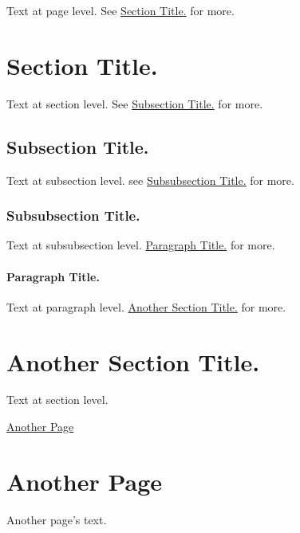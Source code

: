Text at page level. See \hyperlink{mypage_mysect}{Section Title.} for more. \hypertarget{mypage_mysect}{}\section{Section Title.}\label{mypage_mysect}
Text at section level. See \hyperlink{mypage_mysubsect}{Subsection Title.} for more. \hypertarget{mypage_mysubsect}{}\subsection{Subsection Title.}\label{mypage_mysubsect}
Text at subsection level. see \hyperlink{mypage_mysubsubsect}{Subsubsection Title.} for more. \hypertarget{mypage_mysubsubsect}{}\subsubsection{Subsubsection Title.}\label{mypage_mysubsubsect}
Text at subsubsection level. \hyperlink{mypage_mypara}{Paragraph Title.} for more. \hypertarget{mypage_mypara}{}\paragraph{Paragraph Title.}\label{mypage_mypara}
Text at paragraph level. \hyperlink{mypage_mysect2}{Another Section Title.} for more. \hypertarget{mypage_mysect2}{}\section{Another Section Title.}\label{mypage_mysect2}
Text at section level.

\hyperlink{another}{Another Page} \hypertarget{another}{}\section{Another Page}\label{another}
Another page's text. 
